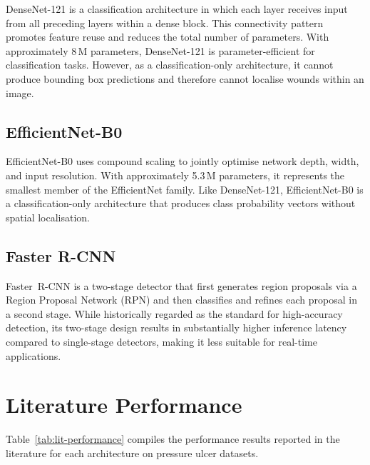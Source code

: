 \documentclass[a4paper,12pt,twoside]{report}
\begin{document}
DenseNet-121 \citep{huang2017densely} is a classification architecture in which
each layer receives input from all preceding layers within a dense block. This
connectivity pattern promotes feature reuse and reduces the total number of
parameters. With approximately 8\,M parameters, DenseNet-121 is parameter-efficient for classification tasks. However, as a classification-only
architecture, it cannot produce bounding box predictions and therefore cannot
localise wounds within an image.

\subsection{EfficientNet-B0}

EfficientNet-B0 \citep{tan2019efficientnet} uses compound scaling to jointly
optimise network depth, width, and input resolution. With approximately 5.3\,M
parameters, it represents the smallest member of the EfficientNet family. Like
DenseNet-121, EfficientNet-B0 is a classification-only architecture that
produces class probability vectors without spatial localisation.

\subsection{Faster R-CNN}

Faster~R-CNN \citep{ren2015faster} is a two-stage detector that first generates
region proposals via a Region Proposal Network (RPN) and then classifies and
refines each proposal in a second stage. While historically regarded as the
standard for high-accuracy detection, its two-stage design results in
substantially higher inference latency compared to single-stage detectors, making
it less suitable for real-time applications.

\section{Literature Performance}
\label{sec:lit-performance}

Table~\ref{tab:lit-performance} compiles the performance results reported in the
literature for each architecture on pressure ulcer datasets.
\end{document}
